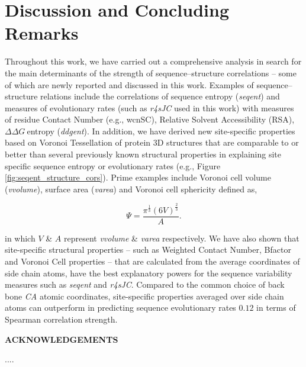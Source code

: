 \documentclass[11pt]{article}
\newcommand{\ddg}{$\Delta\Delta G~$}
\def\Acknowledgements{\bigskip  \bigskip \begin{center} \begin{large}
             \bf ACKNOWLEDGEMENTS \end{large}\end{center}}
\begin{document}
        
        
\section{Discussion and Concluding Remarks}
\label{sec:dcr}

        Throughout this work, we have carried out a comprehensive analysis in search for the main determinants of the strength of sequence--structure correlations -- some of which are newly reported and discussed in this work. Examples of sequence--structure relations include the correlations of sequence entropy ({\it seqent}) and measures of evolutionary rates (such as {\it r4sJC} used in this work) with measures of residue Contact Number (e.g., wcnSC), Relative Solvent Accessibility (RSA), \ddg entropy ({\it ddgent}). In addition, we have derived new site-specific properties based on Voronoi Tessellation of protein 3D structures that are comparable to or better than several previously known structural properties in explaining site specific sequence entropy or evolutionary rates (e.g., Figure \ref{fig:seqent_structure_cors}). Prime examples include Voronoi cell volume ({\it vvolume}), surface area ({\it varea}) and Voronoi cell sphericity defined as,

        \begin{equation}
        \label{eqn:sphericity}
        \Psi = \frac{\pi^{\frac{1}{3}}(6V)^{\frac{2}{3}}}{A}.
        \end{equation}

        in which $V$ \& $A$ represent {\it vvolume} \& {\it varea} respectively. We have also shown that site-specific structural properties -- such as Weighted Contact Number, Bfactor and Voronoi Cell properties -- that are calculated from the average coordinates of side chain atoms, have the best explanatory powers for the sequence variability measures such as {\it seqent} and {\it r4sJC}. Compared to the common choice of back bone {\it CA} atomic coordinates, site-specific properties averaged over side chain atoms can outperform in predicting sequence evolutionary rates $0.12$ in terms of Spearman correlation strength.


\Acknowledgements

....
\end{document}
